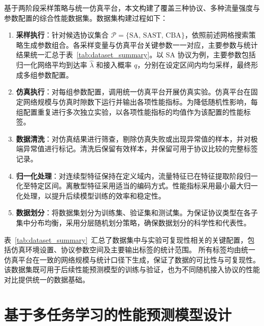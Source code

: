 基于两阶段采样策略与统一仿真平台，本文构建了覆盖三种协议、多种流量强度与参数配置的综合性能数据集。数据集构建过程如下：
\begin{enumerate}[leftmargin=*]
	\item \textbf{采样执行}：针对候选协议集合 $\mathcal{P} = \{\text{SA, SAST, CBA}\}$，依照前述网格搜索策略生成参数组合。各采样变量与仿真平台关键参数一一对应，主要参数与统计结果统一汇总于表~\ref{tab:dataset_summary}。以 SA 协议为例，主要参数包括归一化网络平均到达率 $\hat{\lambda}$ 和接入概率 $q$，分别在设定区间内均匀采样，最终形成多组参数配置。

	\item \textbf{仿真执行}：对每组参数配置，调用统一仿真平台开展仿真实验。仿真平台在固定网络规模与仿真时隙数下运行并输出各项性能指标。为降低随机性影响，每组配置重复进行多次独立实验，以各项性能指标的均值作为该配置的性能标签。

	\item \textbf{数据清洗}：对仿真结果进行筛查，剔除仿真失败或出现异常值的样本，并对极端异常值进行标记。清洗后保留有效样本，并保留可用于协议比较的完整标签记录。

	\item \textbf{归一化处理}：对连续型特征保持在定义域内，流量特征已在特征提取阶段归一化至特定区间。离散型特征采用适当的编码方式。性能指标采用最小最大归一化处理，以提升后续模型训练的效率和稳定性。

	\item \textbf{数据划分}：将数据集划分为训练集、验证集和测试集。为保证协议类型在各子集中分布均衡，采用分层随机划分策略，确保数据划分的科学性和代表性。
\end{enumerate}


表~\ref{tab:dataset_summary}~汇总了数据集中与实验可复现性相关的关键配置，包括仿真环境设置、协议参数空间及主要输出标签的统计范围。
所有标签均由统一仿真平台在一致的网络规模与统计口径下生成，保证了数据的可比性与可复现性。该数据集既可用于后续性能预测模型的训练与验证，也为不同随机接入协议的性能对比提供统一的数据基础。




\section{基于多任务学习的性能预测模型设计}
\label{sec:mt_dnn_model}

